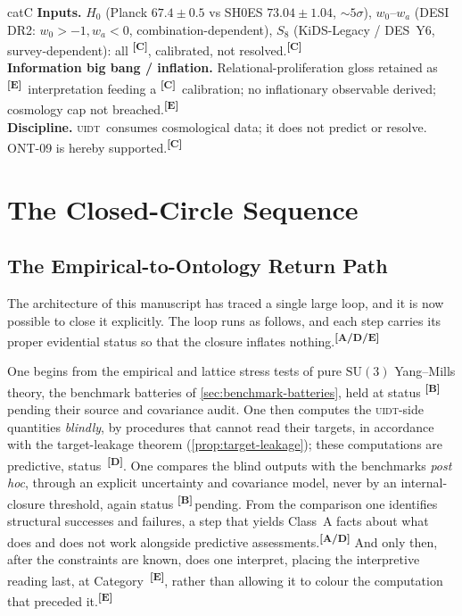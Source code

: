 \documentclass[12pt,a4paper,twoside]{article}
\theoremstyle{plain}
\theoremstyle{definition}
\theoremstyle{remark}
\newcommand{\UIDT}{\textsc{uidt}}
\newcommand{\catmark}[1]{\textsuperscript{\textsf{\textbf{[#1]}}}}
\begin{document}
\begin{evidencebox}{catC}
\textbf{Inputs.} $H_0$ (Planck $67.4\pm0.5$ vs SH0ES $73.04\pm1.04$, $\sim5\sigma$), $w_0$--$w_a$ (DESI DR2: $w_0>-1,w_a<0$, combination-dependent), $S_8$ (KiDS-Legacy / DES~Y6, survey-dependent): all \catmark{C}, calibrated, not
resolved.\catmark{C}\\[0.3em]
\textbf{Information big bang / inflation.} Relational-proliferation gloss retained as \catmark{E}\ interpretation feeding a \catmark{C}\ calibration; no inflationary
observable derived; cosmology cap not breached.\catmark{E}\\[0.3em]
\textbf{Discipline.} \UIDT\ consumes cosmological data; it does not predict or resolve. ONT-09 is hereby supported.\catmark{C}
\end{evidencebox}

\section{The Closed-Circle Sequence}
\label{sec:closed-circle}

\subsection{The Empirical-to-Ontology Return Path}
\label{subsec:return-path}

The architecture of this manuscript has traced a single large loop, and it is now possible to close it explicitly. The loop runs as follows, and each step carries its proper evidential status so that the closure inflates nothing.\catmark{A/D/E}

One begins from the empirical and lattice stress tests of pure $\mathrm{SU}(3)$ Yang--Mills theory, the benchmark batteries of \cref{sec:benchmark-batteries}, held at status \catmark{B}\,pending their source and covariance audit. One then computes the \UIDT-side quantities \emph{blindly}, by procedures that cannot read their targets, in accordance with the target-leakage theorem (\cref{prop:target-leakage}); these computations are predictive, status~\catmark{D}. One compares the blind outputs with the benchmarks \emph{post hoc}, through an explicit uncertainty and covariance model, never by an internal-closure threshold, again status \catmark{B}\,pending. From the comparison one identifies structural successes and failures, a step that yields Class~A facts about what does and does not work alongside predictive assessments.\catmark{A/D} And only then, after the constraints are known, does one interpret, placing the interpretive reading last, at Category~\catmark{E}, rather than allowing it to colour the computation that preceded it.\catmark{E}
\end{document}
